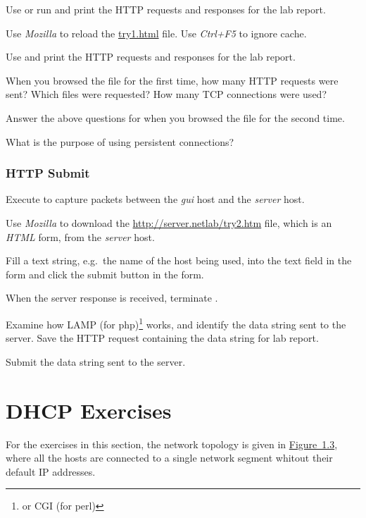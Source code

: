 \documentclass{../UTNetLab}
\begin{document}
    Use  or run  and print the HTTP requests and responses for the lab report.

    Use \textit{Mozilla} to reload the \url{try1.html} file.
    Use \textit{Ctrl+F5} to ignore cache.

    Use  and print the HTTP requests and responses for the lab report.

    \begin{report}
        \item When you browsed the  file for the first time, how many HTTP requests were sent?
        Which files were requested?
        How many TCP connections were used?

        \item Answer the above questions for when you browsed the  file for the second time.

        \item What is the purpose of using persistent connections?
    \end{report}

\section{HTTP Submit}
    Execute  to capture packets between the \textit{gui} host and the \textit{server} host.

    Use \textit{Mozilla} to download the \url{http://server.netlab/try2.htm} file, which is an \textit{HTML} form, from the \textit{server} host.

    Fill a text string, e.g.\ the name of the host being used, into the text field in the form and click the submit button in the form.

    When the server response is received, terminate .

    Examine how LAMP (for php)\footnote{or CGI (for perl)} works, and identify the data string sent to the server.
    Save the HTTP request containing the data string for lab report.

    \begin{report}
        \item Submit the data string sent to the server.
    \end{report}

\part{DHCP Exercises}
    For the exercises in this section, the network topology is given in \hyperref[fig:1.3]{Figure~1.3}, where all the hosts are connected to a single network segment whitout their default IP addresses.
\end{document}
